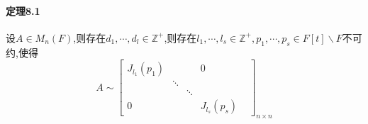 \documentclass{ctexart}
\begin{document}
\paragraph{定理8.1}
设$A\in M_{n}(F)$,则存在$d_{1},\cdots,d_{l}\in \mathbb{Z}^{+}$,则存在$l_{1},\cdots,l_{s} \in \mathbb{Z}^{+},p_{1},\cdots,p_{s} \in F[t]\backslash F$不可约,使得
$$
 A \sim
 \left[
 \begin{matrix}
  J_{l_{1}}(p_{1}) &   &   & 0 \\
    & \ddots &   &   & \\
     &   & \ddots &   &  \\
  0 &   &    & J_{l_{s}}(p_{s})
  \end{matrix}
  \right]_{n\times n}
$$
\end{document}

